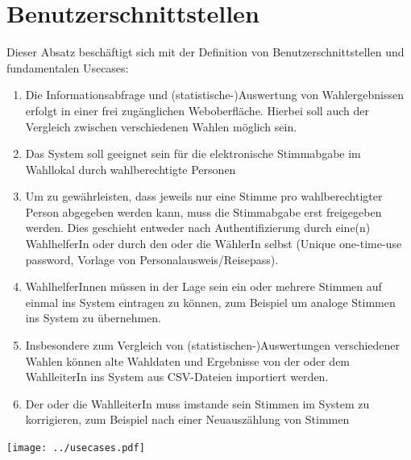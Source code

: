 \documentclass[a4paper,12pt]{article}
\begin{document}
\section{Benutzerschnittstellen}
Dieser Absatz beschäftigt sich mit der Definition von Benutzerschnittstellen und fundamentalen Usecases:

\begin{enumerate}
  \item Die Informationsabfrage und (statistische-)Auswertung von Wahlergebnissen erfolgt
        in einer frei zugänglichen Weboberfläche. Hierbei soll auch der Vergleich zwischen 
        verschiedenen Wahlen möglich sein. 
  \item Das System soll geeignet sein für die elektronische Stimmabgabe im Wahllokal durch
        wahlberechtigte Personen
  \item Um zu gewährleisten, dass jeweils nur eine Stimme pro wahlberechtigter Person abgegeben
        werden kann, muss die Stimmabgabe erst freigegeben werden. Dies geschieht entweder nach
        Authentifizierung durch eine(n) WahlhelferIn oder durch den oder die WählerIn selbst 
        (Unique one-time-use password, Vorlage von Personalausweis/Reisepass).
  \item WahlhelferInnen müssen in der Lage sein ein oder mehrere Stimmen auf einmal ins System
        eintragen zu können, zum Beispiel um analoge Stimmen ins System zu übernehmen. 
  \item Insbesondere zum Vergleich von (statistischen-)Auswertungen verschiedener Wahlen können
        alte Wahldaten und Ergebnisse von der oder dem WahlleiterIn ins System aus CSV-Dateien 
        importiert werden.
  \item Der oder die WahlleiterIn muss imstande sein Stimmen im System zu korrigieren, zum Beispiel
        nach einer Neuauszählung von Stimmen
\end{enumerate}

\begin{center}
	\texttt{[image: ../usecases.pdf]}
\end{center}
\end{document}

